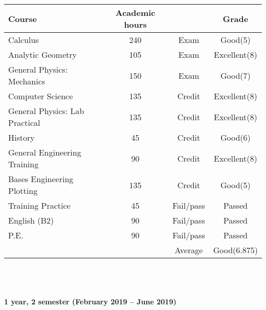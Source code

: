 \documentclass[a4paper]{article}
\newcommand{\upperRomannumeral}[1]{\uppercase\expandafter{\romannumeral#1}}
\begin{document}
\begin{tabular}{|p{6cm}|c|c|c|}
\hline
\textbf{Course}&\textbf{Academic hours}& &\textbf{Grade}\\
\hline

Calculus \upperRomannumeral{1} & 240 & Exam & Good(5)\\

Analytic Geometry & 105 & Exam & Excellent(8)\\

General Physics: Mechanics & 150 & Exam & Good(7)\\

Computer Science & 135 & Credit & Excellent(8)\\

General Physics: Lab Practical & 135 & Credit & Excellent(8)\\

History & 45 & Credit & Good(6)\\

General Engineering Training & 90 & Credit & Excellent(8)\\

Bases Engineering Plotting & 135 & Credit & Good(5)\\

Training Practice & 45 & Fail/pass & Passed\\

English (B2) & 90 & Fail/pass & Passed\\

P.E. & 90 & Fail/pass & Passed\\
\hline
&& Average & Good(6.875)\\
\hline
\end{tabular}
\\ \\
\\
\textbf{1 year, 2 semester (February 2019 -- June 2019)}\\ \\
\end{document}
